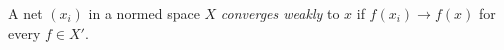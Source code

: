
A net $(x_i)$ in a normed space $X$ \emph{converges weakly} to $x$ if $f(x_i)\to f(x)$ for every $f\in X'$.
